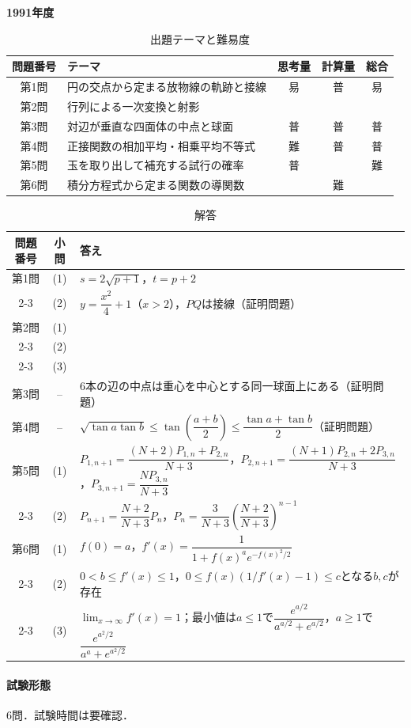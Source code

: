 \documentclass[../../main.tex]{subfiles}
\begin{document}
\begin{center}
  {\fontsize{48pt}{58pt}\selectfont \textbf{1991}\normalsize\textbf{年度}}
\end{center}

\begin{table}[htb]
  \centering
  \caption{出題テーマと難易度}
  \begin{tabular}{|c|p{6.2cm}|c|c|c|}
    \hline
    \textbf{問題番号} & \textbf{テーマ} & \textbf{思考量} & \textbf{計算量} & \textbf{総合} \\
    \hline
    第1問 & 円の交点から定まる放物線の軌跡と接線 & 易 & 普 & 易 \\
    \hline
    第2問 & 行列による一次変換と射影 &  &  &  \\
    \hline
    第3問 & 対辺が垂直な四面体の中点と球面 & 普 & 普 & 普 \\
    \hline
    第4問 & 正接関数の相加平均・相乗平均不等式 & 難 & 普 & 普 \\
    \hline
    第5問 & 玉を取り出して補充する試行の確率 & 普 &  & 難 \\
    \hline
    第6問 & 積分方程式から定まる関数の導関数 &  & 難 &  \\
    \hline
  \end{tabular}
\end{table}

\begin{table}[htb]
  \centering
  \caption{解答}
  \renewcommand{\arraystretch}{1.4}
  \begin{tabular}{|c|c|p{9cm}|}
    \hline
    \textbf{問題番号} & \textbf{小問} & \textbf{答え} \\
    \hline
    第1問 & (1) & $s=2\sqrt{p+1}$，$t=p+2$ \\
    \cline{2-3}
    & (2) & $y=\dfrac{x^2}{4}+1$（$x>2$），$PQ$は接線（証明問題） \\
    \hline
    第2問 & (1) &  \\
    \cline{2-3}
    & (2) &  \\
    \cline{2-3}
    & (3) &  \\
    \hline
    第3問 & -- & 6本の辺の中点は重心を中心とする同一球面上にある（証明問題） \\
    \hline
    第4問 & -- & $\sqrt{\tan a\tan b}\le\tan\left(\dfrac{a+b}{2}\right)\le\dfrac{\tan a+\tan b}{2}$（証明問題） \\
    \hline
    第5問 & (1) & $P_{1,n+1}=\dfrac{(N+2)P_{1,n}+P_{2,n}}{N+3}$，$P_{2,n+1}=\dfrac{(N+1)P_{2,n}+2P_{3,n}}{N+3}$，$P_{3,n+1}=\dfrac{N P_{3,n}}{N+3}$ \\
    \cline{2-3}
    & (2) & $P_{n+1}=\dfrac{N+2}{N+3}P_n$，$P_n=\dfrac{3}{N+3}\left(\dfrac{N+2}{N+3}\right)^{n-1}$ \\
    \hline
    第6問 & (1) & $f(0)=a$，$f'(x)=\dfrac{1}{1+f(x)^a e^{-f(x)^2/2}}$ \\
    \cline{2-3}
    & (2) & $0<b\le f'(x)\le1$，$0\le f(x)(1/f'(x)-1)\le c$となる$b,c$が存在 \\
    \cline{2-3}
    & (3) & $\lim_{x\to\infty}f'(x)=1$；最小値は$a\le1$で$\dfrac{e^{a/2}}{a^{a/2}+e^{a/2}}$，$a\ge1$で$\dfrac{e^{a^2/2}}{a^a+e^{a^2/2}}$ \\
    \hline
  \end{tabular}
\end{table}

\paragraph{試験形態}
6問．試験時間は要確認．
\end{document}
